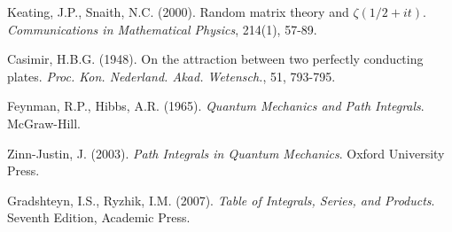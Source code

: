 \documentclass[12pt]{article}
\theoremstyle{plain}
\theoremstyle{definition}
\begin{document}
\begin{thebibliography}{99}
 Keating, J.P., Snaith, N.C. (2000). Random matrix theory and $\zeta(1/2+it)$. \emph{Communications in Mathematical Physics}, 214(1), 57-89.

 Casimir, H.B.G. (1948). On the attraction between two perfectly conducting plates. \emph{Proc. Kon. Nederland. Akad. Wetensch.}, 51, 793-795.

 Feynman, R.P., Hibbs, A.R. (1965). \emph{Quantum Mechanics and Path Integrals}. McGraw-Hill.

 Zinn-Justin, J. (2003). \emph{Path Integrals in Quantum Mechanics}. Oxford University Press.

 Gradshteyn, I.S., Ryzhik, I.M. (2007). \emph{Table of Integrals, Series, and Products}. Seventh Edition, Academic Press.

\end{thebibliography}
\end{document}
